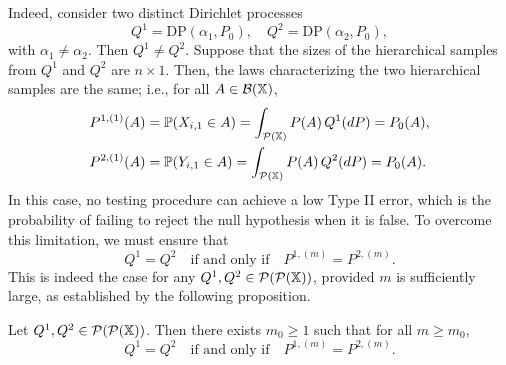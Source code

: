 Indeed, consider two distinct Dirichlet processes 
\[
    Q^1 = \mathrm{DP}(\alpha_1, P_0), \quad Q^2 = \mathrm{DP}(\alpha_2, P_0),
\]
with $\alpha_1 \neq \alpha_2$. Then $Q^1 \neq Q^2$. Suppose that the sizes of the hierarchical samples from $Q^1$ and $Q^2$ are $n \times 1$. Then, the laws characterizing the two hierarchical samples are the same; i.e., for all $A \in \mathcal{B}(\mathbb{X})$,
\begin{align*}
&P^{1,(1)}(A) = \mathbb{P}(X_{i,1} \in A) = \int_{\mathcal{P}(\mathbb{X})} P(A) \, Q^1(dP) = P_0(A), \\
&P^{2,(1)}(A) = \mathbb{P}(Y_{i,1} \in A) = \int_{\mathcal{P}(\mathbb{X})} P(A) \, Q^2(dP) = P_0(A).
\end{align*}
In this case, no testing procedure can achieve a low Type II error, which is the probability of failing to reject the null hypothesis when it is false. To overcome this limitation, we must ensure that 
\[
Q^1 = Q^2 \quad \text{if and only if} \quad P^{1,(m)} = P^{2,(m)}.
\]
This is indeed the case for any $Q^1, Q^2 \in \mathcal{P}(\mathcal{P}(\mathbb{X}))$, provided $m$ is sufficiently large, as established by the following proposition.
\begin{proposition}\label{fd_laws_separate_laws_of_rpms}
Let $Q^1, Q^2 \in \mathcal{P}(\mathcal{P}(\mathbb{X}))$. Then there exists $m_0 \geq 1$ such that for all $m \geq m_0$,
\[
Q^1 = Q^2 \quad \text{if and only if} \quad P^{1,(m)} = P^{2,(m)}.
\]
\end{proposition}
